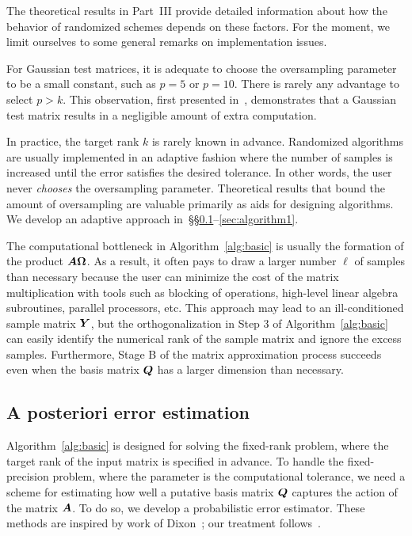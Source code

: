 \documentclass[final]{siamltex}
\newcounter{algorithm}[section]
\begin{document}
\lsp

The theoretical results in Part~III provide detailed information about how
the behavior of randomized schemes depends on these factors.  For the moment,
we limit ourselves to some general remarks on implementation issues.

For Gaussian test matrices, it is adequate to choose the oversampling parameter
to be a small constant, such as $p = 5$ or $p = 10$.  There is rarely any
advantage to select $p > k$.  This observation, first presented in~\cite{random1},
demonstrates that a Gaussian test matrix results in a negligible amount
of extra computation.

In practice, the target rank $k$ is rarely known in advance.  Randomized
algorithms are usually implemented in an adaptive fashion where the number
of samples is increased until the error satisfies the desired tolerance.
In other words, the user never \emph{chooses} the oversampling parameter.
Theoretical results that bound the amount of oversampling are valuable
primarily as aids for designing algorithms.  We develop an adaptive approach
in~\S\S\ref{sec:aposteriori}--\ref{sec:algorithm1}.

The computational bottleneck in Algorithm~\ref{alg:basic} is usually the
formation of the product $\bm{A\Omega}$.  As a result, it often pays
to draw a larger number $\ell$ of samples than necessary because the
user can minimize the cost of the matrix multiplication with tools
such as blocking of operations, high-level linear algebra subroutines,
parallel processors, etc.  This approach may lead to an
ill-conditioned sample matrix $\bm{Y}$, but the orthogonalization
in Step 3 of Algorithm~\ref{alg:basic} can easily identify the numerical
rank of the sample matrix and ignore the excess samples.  Furthermore,
Stage B of the matrix approximation process succeeds even when
the basis matrix $\bm{Q}$ has a larger dimension than necessary.

\subsection{A posteriori error estimation}
\label{sec:aposteriori}

Algorithm~\ref{alg:basic} is designed for solving the fixed-rank
problem, where the target rank of the input matrix is specified
in advance.  To handle the fixed-precision problem, where the
parameter is the computational tolerance, we need a scheme for
estimating how well a putative basis matrix $\bm{Q}$ captures
the action of the matrix $\bm{A}$.
To do so, we develop a probabilistic error estimator.
These methods are inspired by work of
Dixon~\cite{Dix83:Estimating-Extremal}; our treatment
follows~\cite{2007_PNAS,random2}.
\end{document}

